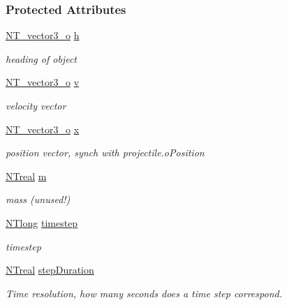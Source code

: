 \subsubsection*{Protected Attributes}
\begin{DoxyCompactItemize}
\item 
\hyperlink{class_n_t__vector3__o}{NT\_\-vector3\_\-o} \hyperlink{class_n_t3_d__trajectory__o_a22fb9e2be33d15bc48c064bfa5fcde28}{h}
\begin{DoxyCompactList}\small\item\em heading of object \item\end{DoxyCompactList}\item 
\hyperlink{class_n_t__vector3__o}{NT\_\-vector3\_\-o} \hyperlink{class_n_t3_d__trajectory__o_a3d9165b8c2f508024d094add69c8e35f}{v}
\begin{DoxyCompactList}\small\item\em velocity vector \item\end{DoxyCompactList}\item 
\hyperlink{class_n_t__vector3__o}{NT\_\-vector3\_\-o} \hyperlink{class_n_t3_d__trajectory__o_a84ace8462727e81be440218fddd9c256}{x}
\begin{DoxyCompactList}\small\item\em position vector, synch with projectile.oPosition \item\end{DoxyCompactList}\item 
\hyperlink{nt__types_8h_a814a97893e9deb1eedcc7604529ba80d}{NTreal} \hyperlink{class_n_t3_d__trajectory__o_a975416fa3b98e931dadd6cdd3344cbdc}{m}
\begin{DoxyCompactList}\small\item\em mass (unused!) \item\end{DoxyCompactList}\item 
\hyperlink{nt__types_8h_a66974263168dc9ddcc3a275844dc632f}{NTlong} \hyperlink{class_n_t3_d__trajectory__o_afddfb3d5558d8a082d32148795ddf942}{timestep}
\begin{DoxyCompactList}\small\item\em timestep \item\end{DoxyCompactList}\item 
\hyperlink{nt__types_8h_a814a97893e9deb1eedcc7604529ba80d}{NTreal} \hyperlink{class_n_t3_d__trajectory__o_a5830f662fa0ace4d6d3af4479a57dd1d}{stepDuration}
\begin{DoxyCompactList}\small\item\em Time resolution, how many seconds does a time step correspond. \item\end{DoxyCompactList}\end{DoxyCompactItemize}


